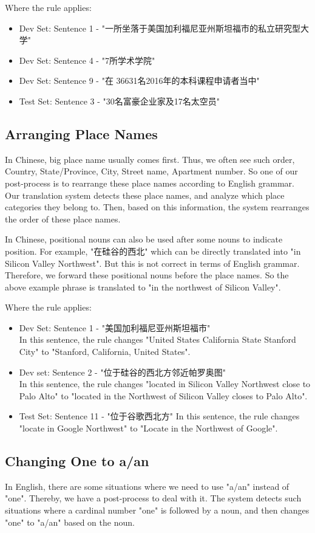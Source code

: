\documentclass[11pt]{article} %
\begin{document}
\begin{CJK}{UTF8}{gbsn}
Where the rule applies:
\begin{itemize}
\item Dev Set: Sentence 1 - "一所坐落于美国加利福尼亚州斯坦福市的私立研究型大学"
\item Dev Set: Sentence 4 - "7所学术学院"
\item Dev Set: Sentence 9 - "在 36631名2016年的本科课程申请者当中"
\item Test Set: Sentence 3 - "30名富豪企业家及17名太空员"
\end{itemize}

\subsection{Arranging Place Names}
In Chinese, big place name usually comes first. Thus, we often see such order, Country, State/Province, City, Street name, Apartment number. So one of our post-process is to rearrange these place names according to English grammar. Our translation system detects these place names, and analyze which place categories they belong to. Then, based on this information, the system rearranges the order of these place names.

In Chinese, positional nouns can also be used after some nouns to indicate position. For example, "在硅谷的西北" which can be directly translated into "in Silicon Valley Northwest". But this is not correct in terms of English grammar. Therefore, we forward these positional nouns before the place names. So the above example phrase is translated to "in the northwest of Silicon Valley".

Where the rule applies:
\begin{itemize}
\item Dev Set: Sentence 1 - "美国加利福尼亚州斯坦福市"\\
In this sentence, the rule changes "United States California State Stanford City" to "Stanford, California, United States".
\item Dev set: Sentence 2 - "位于硅谷的西北方邻近帕罗奥图"\\
In this sentence, the rule changes "located in Silicon Valley Northwest close to Palo Alto" to "located in the Northwest of Silicon Valley closes to Palo Alto".
\item Test Set: Sentence 11 - "位于谷歌西北方"
In this sentence, the rule changes "locate in Google Northwest" to "Locate in the Northwest of Google".
\end{itemize}

\subsection{Changing One to a/an}
In English, there are some situations where we need to use "a/an" instead of "one". Thereby, we have a post-process to deal with it. The system detects such situations where a cardinal number "one" is followed by a noun, and then changes "one" to "a/an" based on the noun. 


\end{CJK}
\end{document}
